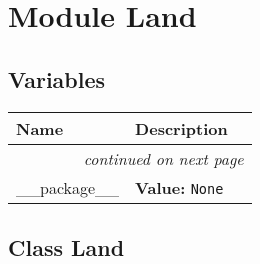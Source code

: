 %
%
%


\section{Module Land}

    \label{Land}


  \subsection{Variables}

    \vspace{-1cm}
\hspace{\varindent}\begin{longtable}{|p{\varnamewidth}|p{\vardescrwidth}|l}
\cline{1-2}
\cline{1-2} \centering \textbf{Name} & \centering \textbf{Description}& \\
\cline{1-2}
\endhead\cline{1-2}\multicolumn{3}{r}{\small\textit{continued on next page}}\\\endfoot\cline{1-2}
\endlastfoot\raggedright \_\-\_\-p\-a\-c\-k\-a\-g\-e\-\_\-\_\- & \raggedright \textbf{Value:} 
{\tt None}&\\
\cline{1-2}
\end{longtable}



\subsection{Class Land}

    \label{Land:Land}

